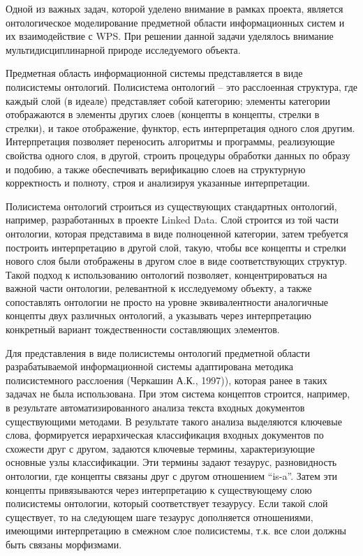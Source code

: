 \documentclass[12pt,a4paper]{ltxdoc}
\begin{document}
Одной из важных задач, которой уделено внимание в рамках проекта, является онтологическое моделирование предметной области информационных систем и их взаимодействие с WPS. При решении данной задачи уделялось внимание мультидисциплинарной природе исследуемого объекта.

Предметная область информационной системы представляется в виде полисистемы онтологий. Полисистема онтологий -- это расслоенная структура, где каждый слой (в идеале) представляет собой категорию; элементы категории отображаются в элементы других слоев (концепты в концепты, стрелки в стрелки), и такое отображение, функтор, есть интерпретация одного слоя другим. Интерпретация позволяет переносить алгоритмы и программы, реализующие свойства одного слоя, в другой, строить процедуры обработки данных по образу и подобию, а также обеспечивать верификацию слоев на структурную корректность и полноту, строя и анализируя указанные интерпретации.

Полисистема онтологий строиться из существующих стандартных онтологий, например, разработанных в проекте Linked Data. Слой строится из той части онтологии, которая представима в виде полноценной категории, затем требуется построить интерпретацию в другой слой, такую, чтобы все концепты и стрелки нового слоя были отображены в другом слое в виде соответствующих структур.  Такой подход к использованию онтологий позволяет, концентрироваться на важной части онтологии, релевантной к исследуемому объекту, а также сопоставлять онтологии не просто на уровне эквивалентности аналогичные концепты двух различных онтологий, а указывать через интерпретацию конкретный вариант тождественности составляющих элементов.

Для представления в виде полисистемы онтологий предметной области разрабатываемой информационной системы адаптирована методика полисистемного расслоения (Черкашин А.К., 1997)), которая ранее в таких задачах не была использована.  При этом система концептов строится, например, в результате автоматизированного анализа текста входных документов существующими методами.  В результате такого анализа выделяются ключевые слова, формируется иерархическая классификация входных документов по схожести друг с другом, задаются ключевые термины, характеризующие основные узлы классификации.  Эти термины задают тезаурус, разновидность онтологии, где концепты связаны друг с другом отношением ``is-a''.  Затем эти концепты привязываются через интерпретацию к существующему слою полисистемы онтологии, который соответствует тезаурусу. Если такой слой существует, то на следующем шаге тезаурус дополняется отношениями, имеющими интерпретацию в смежном слое полисистемы, т.к. все слои должны быть связаны морфизмами.
\end{document}
